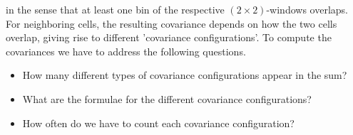 \documentclass[12pt]{article}
\begin{document}
in the sense that at least one bin of the respective $(2\times 2)$-windows overlaps. For neighboring cells, the resulting covariance depends on how the two cells overlap, giving rise to different 'covariance configurations'. To compute the covariances we have to address the following questions.
\begin{itemize}
\item How many different types of covariance configurations appear in the sum?

\item What are the formulae for the different covariance configurations?

\item How often do we have to count each covariance configuration?
\end{itemize}
\end{document}
